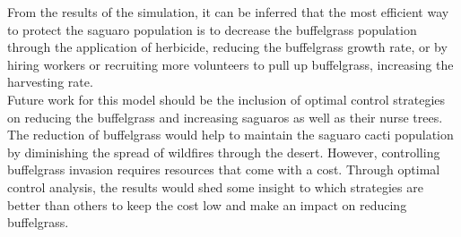 \documentclass[a4paper]{article}
\begin{document}

From the results of the simulation, it can be inferred that the most efficient way to protect the saguaro population is to decrease the buffelgrass population through the application of herbicide, reducing the buffelgrass growth rate, or by hiring workers or recruiting more volunteers to pull up buffelgrass, increasing the harvesting rate.\\

Future work for this model should be the inclusion of optimal control strategies on reducing the buffelgrass and increasing saguaros as well as their nurse trees. The reduction of buffelgrass would help to maintain the saguaro cacti population by diminishing the spread of wildfires through the desert. However, controlling buffelgrass invasion requires resources that come with a cost. Through optimal control analysis, the results would shed some insight to which strategies are better than others to keep the cost low and make an impact on reducing buffelgrass. 
\end{document}
